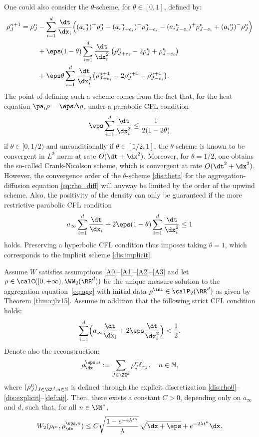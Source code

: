 One could also consider the $\theta$-scheme, for $\theta \in [0,1]$, defined by:
\begin{align}\label{dis:theta}
\rho_{J}^{n+1} = \rho_{J}^n &- \sum_{i=1}^{d} \frac{\dt}{\dx_i}
\Big(({a_i}^n_{J})^+ \rho_{J}^n - ({a_i}^n_{J+e_i})^- \rho_{J+e_i}^n
-({a_i}^n_{J-e_i})^+ \rho_{J-e_i}^n + ({a_i}^n_{J})^- \rho_{J}^n \Big)\notag \\
& + \eps (1-\theta) \sum_{i=1}^{d} \frac{\dt}{\dx_i^2} \left(\rho_{J+e_i}^n - 2\rho_J^n + \rho_{J-e_i}^n \right) \\
& + \eps \theta \sum_{i=1}^{d} \frac{\dt}{\dx_i^2} \bigl(\rho_{J+e_i}^{n+1} - 2\rho_J^{n+1} + \rho_{J-e_i}^{n+1} \bigr).\notag
\end{align}
The point of defining such a scheme comes from the fact that, for the heat equation $\pa_t \rho = \eps \Delta \rho$, under a parabolic CFL condition
\[
\eps \sum_{i=1}^{d} \frac{\dt}{\dx_i^2} \leq \frac{1}{2(1-2\theta)}
\]
if $\theta \in [0, 1/2)$ and unconditionally if $\theta \in [1/2, 1]$, the $\theta$-scheme is known to be convergent in $L^2$ norm at rate $O(\dt + \dx^2)$. Moreover, for $\theta = 1/2$, one obtains the so-called Crank-Nicolson scheme, which is convergent at rate $O(\dt^2 + \dx^2)$.
However, the convergence order of the $\theta$-scheme \eqref{dis:theta} for the aggregation-diffusion equation \eqref{eq:rho_diff} will anyway be limited by the order of the upwind scheme. Also, the positivity of the density can only be guaranteed if the more restrictive parabolic CFL condition
\[
a_\infty \sum_{i=1}^{d} \frac{\dt}{\dx_i} + 2\eps (1-\theta) \sum_{i=1}^{d} \frac{\dt}{\dx_i^2} \leq 1
\]
holds. Preserving a hyperbolic CFL condition thus imposes taking $\theta = 1$, which corresponds to the implicit scheme \eqref{dis:implicit}.

\begin{prop}\label{prop:cvOrder1/2:scheme}
Assume $W$ satisfies assumptions \eqref{A0}--\eqref{A1}--\eqref{A2}--\eqref{A3} and let $\rho \in \calC([0,+\infty), \WW_2(\RR^d))$ be the unique measure solution to the aggregation equation~\eqref{eq:agg} with initial data $\rho^{\ini} \in \calP_2(\RR^d)$ as
given by Theorem \ref{thm:cjlv15}. Assume in addition that the following strict CFL condition holds:
\begin{equation}
\label{CFL}
\sum_{i=1}^d \Bigl(a_\infty \frac{\dt}{\dx_i} + 2\eps \frac{\dt}{\dx_i^2}\Bigr) < \frac 12.
\end{equation}
Denote also the reconstruction:
\[
\rho_{\dx}^{\eps,n} := \sum_{J\in \ZZ^d} \rho_J^n \delta_{x_J},
\quad n \in {\mathbb N},
\]
where $(\rho_J^n)_{J\in \ZZ^d, n \in \mathbb N}$ is defined through the explicit discretization
\eqref{dis:rho0}--\eqref{dis:explicit}--\eqref{def:aij}.
Then, there exists a constant $C>0$, depending only on $a_\infty$ and $d$, such that, for all $n\in \NN^*$,
\begin{equation}
\label{eq:cvOrder1/2:scheme:bound:1}
W_2(\rho_{t^n},\rho_{\dx}^{\eps,n} ) \leq C \sqrt{\frac{1 - e^{-4\lambda t^n}}{\lambda}}\, \sqrt{\dx + \eps} + e^{-2\lambda t^n} \dx.
\end{equation}
\end{prop}

